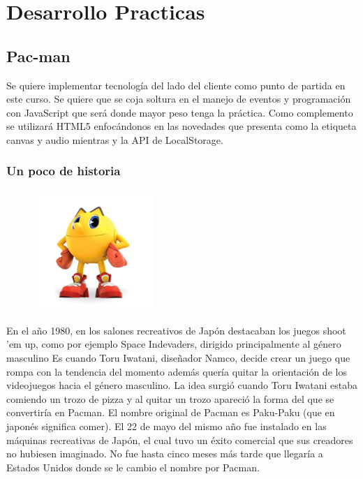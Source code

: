 
\chapter{Desarrollo Practicas} %

\label{Chapter5} %

\section{Pac-man}
Se quiere implementar tecnología del lado del cliente como punto de partida en este curso. Se
quiere que se coja soltura en el manejo de eventos y programación con JavaScript que será donde
mayor peso tenga la práctica.
Como complemento se utilizará HTML5 enfocándonos en las novedades que presenta como la
etiqueta canvas y audio mientras y la API de LocalStorage.
\subsection{Un poco de historia}
\begin{figure}
  \begin{center}
    \includegraphics[width=0.4\textwidth]{Figures/pac_man}
      \end{center}
\end{figure}
En el año 1980, en los salones recreativos de Japón destacaban los juegos shoot 'em up, como
por ejemplo Space Indevaders, dirigido principalmente al género masculino
Es cuando Toru Iwatani, diseñador Namco, decide crear un juego que rompa con la tendencia del
momento además quería quitar la orientación de los videojuegos hacia el género masculino.
La idea surgió cuando Toru Iwatani estaba comiendo un trozo de pizza y al quitar un trozo
apareció la forma del que se convertiría en Pacman. El nombre original de Pacman es Paku-Paku
(que en japonés significa comer).
El 22 de mayo del mismo año fue instalado en las máquinas recreativas de Japón, el cual tuvo un
éxito comercial que sus creadores no hubiesen imaginado. No fue hasta cinco meses más tarde que
llegaría a Estados Unidos donde se le cambio el nombre por Pacman.

